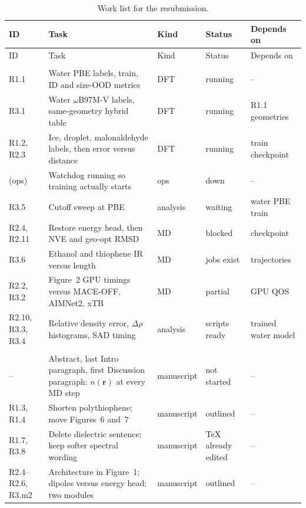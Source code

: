 \documentclass[11pt]{article}
\begin{document}
{\small
\setlength{\tabcolsep}{4pt}
\begin{longtable}{
  >{\raggedright\arraybackslash}p{}
  >{\raggedright\arraybackslash}p{}
  >{\raggedright\arraybackslash}p{}
  >{\raggedright\arraybackslash}p{}
  >{\raggedright\arraybackslash}p{}}
\caption{Work list for the resubmission.}\\
\toprule
ID & Task & Kind & Status & Depends on \\
\midrule
\endfirsthead
\midrule
ID & Task & Kind & Status & Depends on \\
\midrule
\endhead
\bottomrule
\endlastfoot

\multicolumn{5}{l}{\emph{Compute}} \\
\midrule
R1.1 & Water PBE labels, train, ID and size-OOD metrics & DFT & running & -- \\
R3.1 & Water $\omega$B97M-V labels, same-geometry hybrid table & DFT & running & R1.1 geometries \\
R1.2, R2.3 & Ice, droplet, malonaldehyde labels, then error versus distance & DFT & running & train checkpoint \\
(ops) & Watchdog running so training actually starts & ops & down & -- \\
R3.5 & Cutoff sweep at PBE & analysis & waiting & water PBE train \\
R2.4, R2.11 & Restore energy head, then NVE and geo-opt RMSD & MD & blocked & 2024 checkpoint \\
R3.6 & Ethanol and thiophene IR versus length & MD & jobs exist & trajectories \\
R2.2, R3.2 & Figure~2 GPU timings versus MACE-OFF, AIMNet2, xTB & MD & partial & GPU QOS \\
R2.10, R3.3, R3.4 & Relative density error, $\Delta\rho$ histograms, SAD timing & analysis & scripts ready & trained water model \\
\midrule
\multicolumn{5}{l}{\emph{Manuscript (can start now)}} \\
\midrule
-- & Abstract, last Intro paragraph, first Discussion paragraph: $n(\mathbf{r})$ at every MD step & manuscript & not started & -- \\
R1.3, R1.4 & Shorten polythiophene; move Figures~6 and~7 & manuscript & outlined & -- \\
R1.7, R3.8 & Delete dielectric sentence; keep softer spectral wording & manuscript & TeX already edited & -- \\
R2.4--R2.6, R3.m2 & Architecture in Figure~1; dipoles versus energy head; two modules & manuscript & outlined & -- \\

\end{longtable}}
\end{document}
